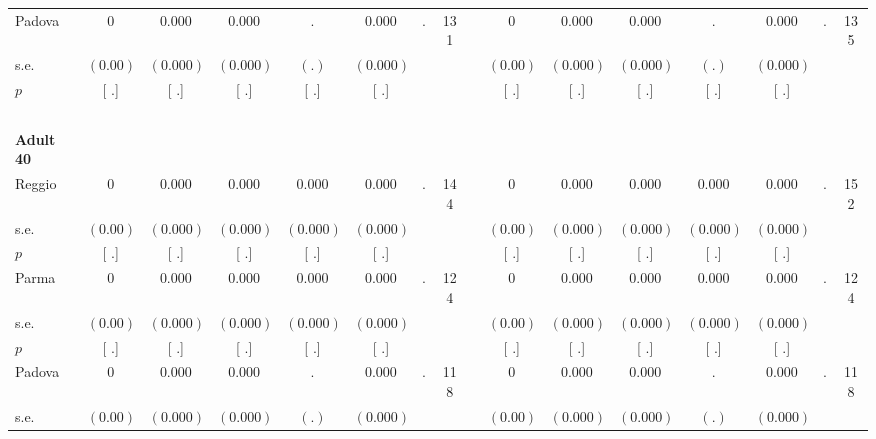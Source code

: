 \begin{longtable}{L{8em} c c c c c c c p{1em} c c c c c c c}
\quad \quad \quad Padova& 0 &     0.000 &     0.000 &         . &     0.000 &         . &       131 & & 0 &     0.000 &     0.000 &         . &     0.000 &         . &       135  \\*
\quad \quad \quad \quad s.e.& $ (     0.00)$ & $ (    0.000)$ & $ (    0.000)$ & $ (        .)$ & $ (    0.000)$ & & & & $ (     0.00)$ & $ (    0.000)$ & $ (    0.000)$ & $ (        .)$ & $ (    0.000)$ & &  \\*
\quad \quad \quad \quad $ p$ & [        .] & [        .] & [        .] & [        .] & [        .] & & & & [        .] & [        .] & [        .] & [        .] & [        .] & &  \\[1em]
~\\[1em]
\quad \quad \textbf{Adult 40} & & & & & & & & & & & & & & & \\* 
\quad \quad \quad Reggio& 0 &     0.000 &     0.000 &     0.000 &     0.000 &         . &       144 & & 0 &     0.000 &     0.000 &     0.000 &     0.000 &         . &       152  \\*
\quad \quad \quad \quad s.e.& $ (     0.00)$ & $ (    0.000)$ & $ (    0.000)$ & $ (    0.000)$ & $ (    0.000)$ & & & & $ (     0.00)$ & $ (    0.000)$ & $ (    0.000)$ & $ (    0.000)$ & $ (    0.000)$ & &  \\*
\quad \quad \quad \quad $ p$ & [        .] & [        .] & [        .] & [        .] & [        .] & & & & [        .] & [        .] & [        .] & [        .] & [        .] & &  \\[1em]
\quad \quad \quad Parma& 0 &     0.000 &     0.000 &     0.000 &     0.000 &         . &       124 & & 0 &     0.000 &     0.000 &     0.000 &     0.000 &         . &       124  \\*
\quad \quad \quad \quad s.e.& $ (     0.00)$ & $ (    0.000)$ & $ (    0.000)$ & $ (    0.000)$ & $ (    0.000)$ & & & & $ (     0.00)$ & $ (    0.000)$ & $ (    0.000)$ & $ (    0.000)$ & $ (    0.000)$ & &  \\*
\quad \quad \quad \quad $ p$ & [        .] & [        .] & [        .] & [        .] & [        .] & & & & [        .] & [        .] & [        .] & [        .] & [        .] & &  \\[1em]
\quad \quad \quad Padova& 0 &     0.000 &     0.000 &         . &     0.000 &         . &       118 & & 0 &     0.000 &     0.000 &         . &     0.000 &         . &       118  \\*
\quad \quad \quad \quad s.e.& $ (     0.00)$ & $ (    0.000)$ & $ (    0.000)$ & $ (        .)$ & $ (    0.000)$ & & & & $ (     0.00)$ & $ (    0.000)$ & $ (    0.000)$ & $ (        .)$ & $ (    0.000)$ & &  \\*

\end{longtable}
